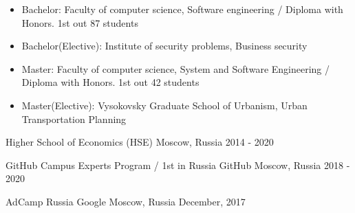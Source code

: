 \vspace{-0.3cm}

\cventryeducation
{
\vspace{-0.4cm}
\begin{itemize}
\item Bachelor: Faculty of computer science, Software engineering / Diploma with Honors. 1st out 87 students
\item Bachelor(Elective): Institute of security problems, Business security
\item Master: Faculty of computer science, System and Software Engineering / Diploma with Honors. 1st out 42 students
\item Master(Elective): Vysokovsky Graduate School of Urbanism, Urban Transportation Planning
\end{itemize}
} %
{Higher School of Economics (HSE)} %
{Moscow, Russia} %
{2014 - 2020} %

\vspace{-0.5cm}
\cventryeducation
{GitHub Campus Experts Program / 1st in Russia} %
{GitHub} %
{Moscow, Russia} %
{2018 - 2020} %

\vspace{-0.1cm}
\cventryeducation
{AdCamp Russia} %
{Google} %
{Moscow, Russia} %
{December, 2017} %



